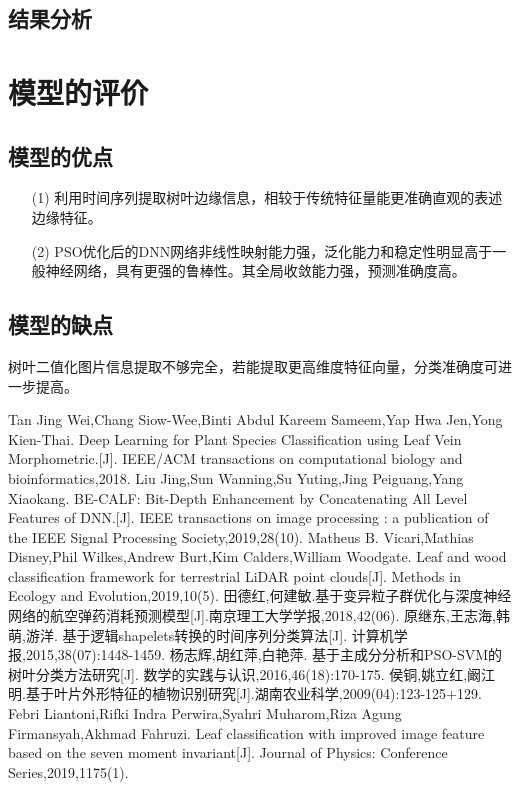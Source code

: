 \documentclass{whutmod}
\begin{document}
	

	
	\subsection{结果分析}
     



	\section{模型的评价}
	\subsection{模型的优点}
		\begin{itemize}                                             
		\item [(1)] 利用时间序列提取树叶边缘信息，相较于传统特征量能更准确直观的表述边缘特征。
		\item [(2)] PSO优化后的DNN网络非线性映射能力强，泛化能力和稳定性明显高于一般神经网络，具有更强的鲁棒性。其全局收敛能力强，预测准确度高。
	
	\end{itemize}
	\subsection{模型的缺点}
	树叶二值化图片信息提取不够完全，若能提取更高维度特征向量，分类准确度可进一步提高。

    
	\newpage	%
	\nocite{*}		%
%
%	
\begin{thebibliography}{9}%
	 Tan Jing Wei,Chang Siow-Wee,Binti Abdul Kareem Sameem,Yap Hwa Jen,Yong Kien-Thai. Deep Learning for Plant Species Classification using Leaf Vein Morphometric.[J]. IEEE/ACM transactions on computational biology and bioinformatics,2018.
	Liu Jing,Sun Wanning,Su Yuting,Jing Peiguang,Yang Xiaokang. BE-CALF: Bit-Depth Enhancement by Concatenating All Level Features of DNN.[J]. IEEE transactions on image processing : a publication of the IEEE Signal Processing Society,2019,28(10).
	Matheus B. Vicari,Mathias Disney,Phil Wilkes,Andrew Burt,Kim Calders,William Woodgate. Leaf and wood classification framework for terrestrial LiDAR point clouds[J]. Methods in Ecology and Evolution,2019,10(5).
	田德红,何建敏.基于变异粒子群优化与深度神经网络的航空弹药消耗预测模型[J].南京理工大学学报,2018,42(06).
	原继东,王志海,韩萌,游洋. 基于逻辑shapelets转换的时间序列分类算法[J]. 计算机学报,2015,38(07):1448-1459.
	杨志辉,胡红萍,白艳萍. 基于主成分分析和PSO-SVM的树叶分类方法研究[J]. 数学的实践与认识,2016,46(18):170-175.
	侯铜,姚立红,阚江明.基于叶片外形特征的植物识别研究[J].湖南农业科学,2009(04):123-125+129.
	Febri Liantoni,Rifki Indra Perwira,Syahri Muharom,Riza Agung Firmansyah,Akhmad Fahruzi. Leaf classification with improved image feature based on the seven moment invariant[J]. Journal of Physics: Conference Series,2019,1175(1).
\end{thebibliography}
\end{document}
